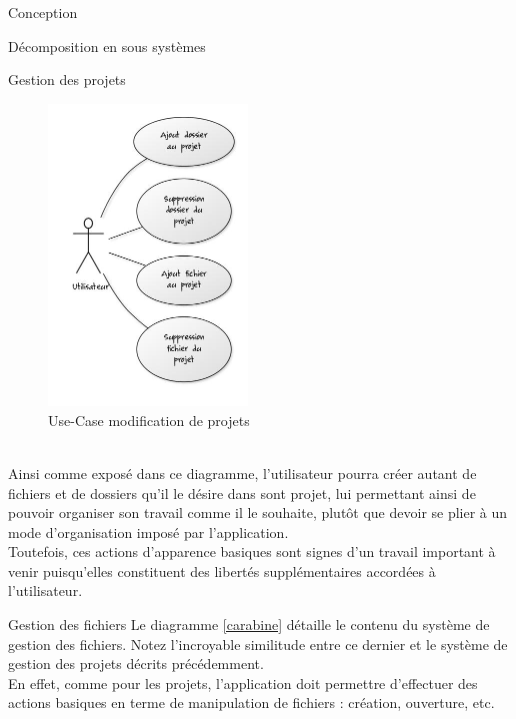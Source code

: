 \documentclass[a4paper, 12pt]{report}
\begin{document}
\begin{part}{Conception}
\begin{chapter}{Décomposition en sous systèmes}
\begin{section}{Gestion des projets}
				\begin{figure}[h]
					\begin{center}
						\includegraphics[height=8cm]{images/modificationProjet.jpg}
						\caption{Use-Case modification de projets}
						\label{ucgp}
					\end{center}
				\end{figure}~\\

				Ainsi comme exposé dans ce diagramme, l'utilisateur pourra créer autant de fichiers et de dossiers qu'il le désire dans 
				sont projet, lui permettant ainsi de pouvoir organiser son travail comme il le souhaite, plutôt que devoir se plier à un 
				mode d'organisation imposé par l'application.\\
				Toutefois, ces actions d'apparence basiques sont signes d'un travail important à venir puisqu'elles constituent des libertés
				supplémentaires	accordées à l'utilisateur.\\
			\end{section}
			\begin{section}{Gestion des fichiers}
				Le diagramme \ref{carabine} détaille le contenu du système de gestion des fichiers. Notez l'incroyable similitude entre ce
				dernier et le système de gestion des projets décrits précédemment.\\
				En effet, comme pour les projets, l'application doit permettre d'effectuer des actions basiques en terme de manipulation de fichiers :
				création, ouverture, etc.\\



\end{section}
\end{chapter}
\end{part}
\end{document}
